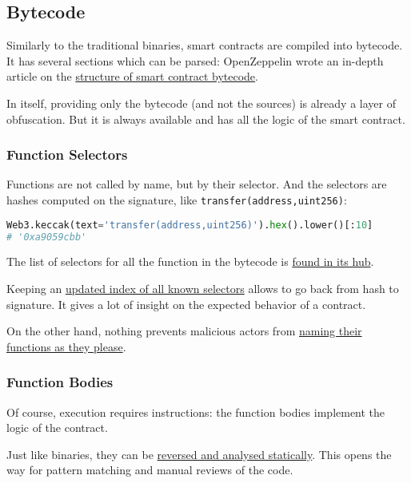 \subsection{Bytecode}

Similarly to the traditional binaries, smart contracts are compiled into bytecode.
It has several sections which can be parsed: OpenZeppelin wrote an in-depth article on the \href{\urldiagrambytecode}{structure of smart contract bytecode}.

In itself, providing only the bytecode (and not the sources) is already a layer of obfuscation.
But it is always available and has all the logic of the smart contract.

\subsubsection{Function Selectors}

Functions are not called by name, but by their selector.
And the selectors are hashes computed on the signature, like \lstinline[language=Solidity]{transfer(address,uint256)}:

\begin{lstlisting}[language=Python]
Web3.keccak(text='transfer(address,uint256)').hex().lower()[:10]
# '0xa9059cbb'
\end{lstlisting}

The list of selectors for all the function in the bytecode is \href{\urldiagrambytecode}{found in its hub}.

Keeping an \href{\urlwebindexselectors}{updated index of all known selectors} allows to go back from hash to signature.
It gives a lot of insight on the expected behavior of a contract.

On the other hand, nothing prevents malicious actors from \href{https://www.4byte.directory/signatures/?bytes4_signature=0xa9059cbb}{naming their functions as they please}.

\subsubsection{Function Bodies}

Of course, execution requires instructions: the function bodies implement the logic of the contract.

Just like binaries, they can be \href{\urlarticlereversingcontract}{reversed and analysed statically}.
This opens the way for pattern matching and manual reviews of the code.

